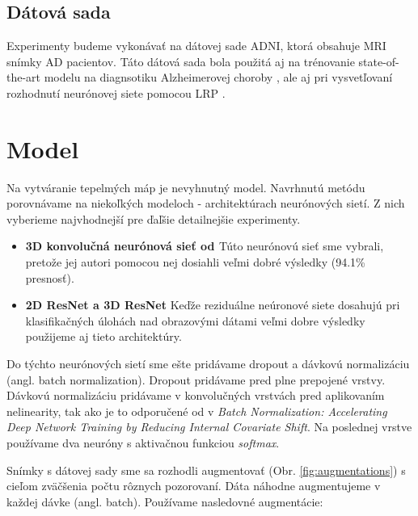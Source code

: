 \subsection{Dátová sada} Experimenty budeme vykonávať na dátovej sade ADNI, ktorá obsahuje MRI snímky AD pacientov. Táto dátová sada bola použitá aj na trénovanie state-of-the-art modelu na diagnsotiku Alzheimerovej choroby \cite{esmaeilzadeh2018end}, ale aj pri vysvetľovaní rozhodnutí neurónovej siete pomocou LRP \cite{bohle2019layer}. 


\section{Model \label{sec:design_model}}

Na vytváranie tepelmých máp je nevyhnutný model. Navrhnutú metódu porovnávame na niekoľkých modeloch - architektúrach neurónových sietí. Z nich vyberieme najvhodnejší pre ďaľšie detailnejšie experimenty.

\begin{itemize}
    \item \textbf{3D konvolučná neurónová sieť od \citeauthor*{esmaeilzadeh2018end}} Túto neurónovú sieť sme vybrali, pretože jej autori pomocou nej dosiahli veľmi dobré výsledky (94.1\% presnosť).
    \item \textbf{2D ResNet a 3D ResNet} Keďže reziduálne neúronové siete dosahujú pri klasifikačných úlohách nad obrazovými dátami veľmi dobre výsledky použijeme aj tieto architektúry.
\end{itemize}

Do týchto neurónových sietí sme ešte pridávame dropout a dávkovú normalizáciu (angl. batch normalization). Dropout pridávame pred plne prepojené vrstvy. Dávkovú normalizáciu pridávame v konvolučných vrstvách pred aplikovaním nelinearity, tak ako je to odporučené od \citeauthor*{ioffe2015batch} v \textit{Batch Normalization: Accelerating Deep Network Training by Reducing Internal Covariate Shift}. Na poslednej vrstve používame dva neuróny s aktivačnou funkciou \textit{softmax}.

Snímky s dátovej sady sme sa rozhodli augmentovať (Obr. \ref{fig:augmentations}) s cieľom zväčšenia počtu rôznych pozorovaní. Dáta náhodne augmentujeme v každej dávke (angl. batch). Používame nasledovné augmentácie:

